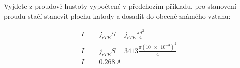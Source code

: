 Vyjdete z proudové hustoty vypočtené v předchozím příkladu, pro stanovení proudu stačí stanovit plochu katody a dosadit do obecně známého vztahu:

\begin{align*}
  I&=j_{eTE} S = j_{eTE} \frac{\pi d^2}{4}\\
  I&=j_{eTE} S = \num{3413} \frac{\pi (\num{10e-3})^2}{4}\\
  I&=\qty{0.268}{\ampere}
\end{align*}


